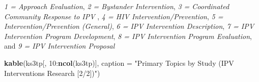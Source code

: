 \documentclass[11pt,]{tufte-book}
\newenvironment{Shaded}{}{}
\newcommand{\KeywordTok}[1]{\textcolor[rgb]{0.00,0.44,0.13}{\textbf{#1}}}
\newcommand{\DataTypeTok}[1]{\textcolor[rgb]{0.56,0.13,0.00}{#1}}
\newcommand{\DecValTok}[1]{\textcolor[rgb]{0.25,0.63,0.44}{#1}}
\newcommand{\StringTok}[1]{\textcolor[rgb]{0.25,0.44,0.63}{#1}}
\newcommand{\OperatorTok}[1]{\textcolor[rgb]{0.40,0.40,0.40}{#1}}
\newcommand{\NormalTok}[1]{#1}
\begin{document}
\emph{1 = Approach Evaluation}, \emph{2 = Bystander Intervention},
\emph{3 = Coordinated Community Response to IPV }, \emph{4 = HIV
Intervention/Prevention}, \emph{5 = Intervention/Prevention (General)},
\emph{6 = IPV Intervention Description}, \emph{7 = IPV Intervention
Program Development}, \emph{8 = IPV Intervention Program Evaluation},
and \emph{9 = IPV Intervention Proposal}

\begin{Shaded}
\begin{Highlighting}[]
\KeywordTok{kable}\NormalTok{(ks3tp[, }\DecValTok{10}\OperatorTok{:}\KeywordTok{ncol}\NormalTok{(ks3tp)], }\DataTypeTok{caption =} \StringTok{"Primary Topics by Study (IPV Interventions Research [2/2])"}\NormalTok{)}
\end{Highlighting}
\end{Shaded}
\end{document}
